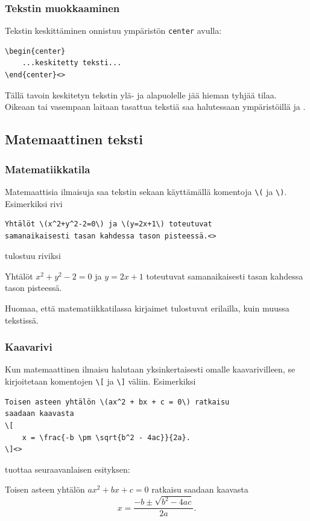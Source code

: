 \begin{frame}[fragile]
    \frametitle{Tekstin muokkaaminen}
    Tekstin keskittäminen onnistuu ympäristön \verb-center- avulla:
    \begin{lstlisting}
\begin{center}
    ...keskitetty teksti...
\end{center}<>
    \end{lstlisting}
    Tällä tavoin keskitetyn tekstin ylä- ja alapuolelle jää hieman tyhjää tilaa. \vaihto\pause
    Oikeaan tai vasempaan laitaan tasattua tekstiä saa halutessaan ympäristöillä  ja .

\end{frame}
\begin{frame}
    
\end{frame}


\subsection{Matemaattinen teksti}
\begin{frame}[fragile]
    \frametitle{Matematiikkatila}
    Matemaattisia ilmaisuja saa tekstin sekaan käyttämällä komentoja \lstinline+\(+  
    ja \lstinline+\)+. \pause Esimerkiksi rivi
    \begin{lstlisting}
Yhtälöt \(x^2+y^2-2=0\) ja \(y=2x+1\) toteutuvat 
samanaikaisesti tasan kahdessa tason pisteessä.<>
    \end{lstlisting}
    \pause
    tulostuu riviksi 
    \begin{sample}
        Yhtälöt \(x^2+y^2-2=0\) ja \(y=2x+1\) toteutuvat samanaikaisesti tasan kahdessa tason pisteessä.
    \end{sample} 
    \pause
    Huomaa, että matematiikkatilassa kirjaimet tulostuvat erilailla, kuin muussa tekstissä. 
\end{frame}

\begin{frame}[fragile]
    
\end{frame}

\begin{frame}[fragile]
    \frametitle{Kaavarivi}
    Kun matemaattinen ilmaisu halutaan yksinkertaisesti omalle kaavarivilleen, se kirjoitetaan komentojen \lstinline-\[- ja \lstinline-\]- väliin.
    \pause
    Esimerkiksi 
    \begin{lstlisting}
Toisen asteen yhtälön \(ax^2 + bx + c = 0\) ratkaisu
saadaan kaavasta
\[
    x = \frac{-b \pm \sqrt{b^2 - 4ac}}{2a}.
\]<>
    \end{lstlisting}
    tuottaa seuraavanlaisen esityksen:
    \pause
    \begin{sample}
        Toisen asteen yhtälön \(ax^2 + bx + c = 0\)
        ratkaisu saadaan kaavasta
        \[
            x = \frac{-b \pm \sqrt{b^2 - 4ac}}{2a}.
        \]
    \end{sample}
\end{frame}

